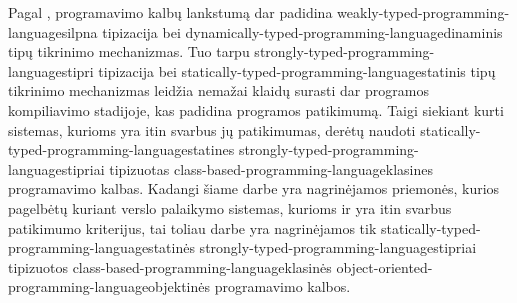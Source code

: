Pagal \cite[2]{Madsen:1990:STO:97946.97964}, programavimo kalbų
lankstumą dar padidina \gls{weakly-typed-programming-language}{silpna
tipizacija} bei \gls{dynamically-typed-programming-language}{dinaminis
tipų tikrinimo mechanizmas}. Tuo tarpu
\gls{strongly-typed-programming-language}{stipri tipizacija} bei
\gls{statically-typed-programming-language}{statinis tipų tikrinimo
mechanizmas} leidžia nemažai klaidų surasti dar programos kompiliavimo
stadijoje, kas padidina programos patikimumą. Taigi siekiant kurti
sistemas, kurioms yra itin svarbus jų patikimumas, derėtų naudoti
\gls{statically-typed-programming-language}{statines}
\gls{strongly-typed-programming-language}{stipriai tipizuotas}
\gls{class-based-programming-language}{klasines} programavimo kalbas.
Kadangi šiame darbe yra nagrinėjamos priemonės, kurios pagelbėtų
kuriant verslo palaikymo sistemas, kurioms ir yra itin svarbus
patikimumo kriterijus, tai toliau darbe yra nagrinėjamos tik
\gls{statically-typed-programming-language}{statinės}
\gls{strongly-typed-programming-language}{stipriai tipizuotos}
\gls{class-based-programming-language}{klasinės}
\gls{object-oriented-programming-language}{objektinės} programavimo
kalbos.

